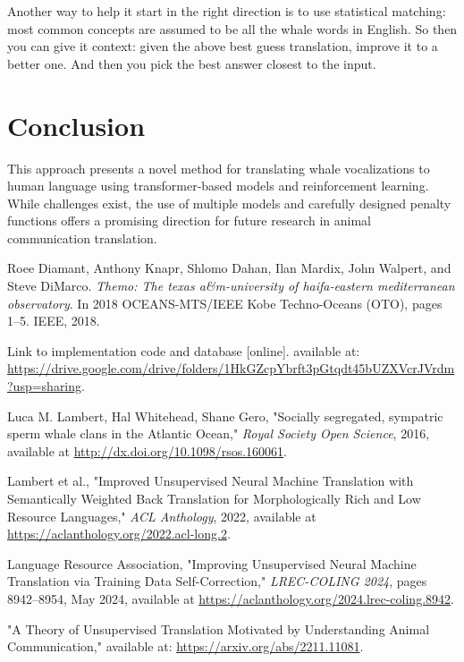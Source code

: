 \documentclass{article}
\begin{document}
Another way to help it start in the right direction is to use statistical matching: most common concepts are assumed to be all the whale words in English. So then you can give it context: given the above best guess translation, improve it to a better one. And then you pick the best answer closest to the input.

\section{Conclusion}
This approach presents a novel method for translating whale vocalizations to human language using transformer-based models and reinforcement learning. While challenges exist, the use of multiple models and carefully designed penalty functions offers a promising direction for future research in animal communication translation.

\begin{thebibliography}{9}

Roee Diamant, Anthony Knapr, Shlomo Dahan, Ilan Mardix, John Walpert, and Steve DiMarco. 
\textit{Themo: The texas a\&m-university of haifa-eastern mediterranean observatory}. 
In 2018 OCEANS-MTS/IEEE Kobe Techno-Oceans (OTO), pages 1–5. IEEE, 2018.

Link to implementation code and database [online]. available at: 
\url{https://drive.google.com/drive/folders/1HkGZcpYbrft3pGtqdt45bUZXVcrJVrdm?usp=sharing}.

Luca M. Lambert, Hal Whitehead, Shane Gero, "Socially segregated, sympatric sperm whale clans in the Atlantic Ocean," \textit{Royal Society Open Science}, 2016, available at \url{http://dx.doi.org/10.1098/rsos.160061}.

Lambert et al., "Improved Unsupervised Neural Machine Translation with Semantically Weighted Back Translation for Morphologically Rich and Low Resource Languages," \textit{ACL Anthology}, 2022, available at \url{https://aclanthology.org/2022.acl-long.2}.

Language Resource Association, "Improving Unsupervised Neural Machine Translation via Training Data Self-Correction," \textit{LREC-COLING 2024}, pages 8942–8954, May 2024, available at \url{https://aclanthology.org/2024.lrec-coling.8942}.

"A Theory of Unsupervised Translation Motivated by Understanding Animal Communication," available at: \url{https://arxiv.org/abs/2211.11081}.

\end{thebibliography}
\end{document}
